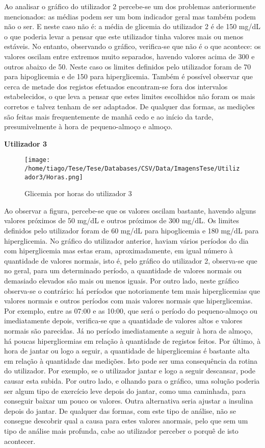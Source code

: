Ao analisar o gráfico do utilizador 2 percebe-se um dos problemas anteriormente mencionados: as médias podem ser um bom indicador geral mas também podem não o ser. E neste caso não é: a média de glicemia do utilizador 2 é de 150 mg/dL o que poderia levar a pensar que este utilizador tinha valores mais ou menos estáveis. No entanto, observando o gráfico, verifica-se que não é o que acontece: os valores oscilam entre extremos muito separados, havendo valores acima de 300 e outros abaixo de 50. Neste caso os limites definidos pelo utilizador foram de 70 para hipoglicemia e de 150 para hiperglicemia. Também é possível observar que cerca de metade dos registos efetuados encontram-se fora dos intervalos estabelecidos, o que leva a pensar que estes limites escolhidos não foram os mais corretos e talvez tenham de ser adaptados. De qualquer das formas, as medições são feitas mais frequentemente de manhã cedo e ao início da tarde, presumivelmente à hora de pequeno-almoço e almoço. 


\textbf{Utilizador 3}

\begin{figure}[H]
\centering
\texttt{[image: /home/tiago/Tese/Tese/Databases/CSV/Data/ImagensTese/Utilizador3/Horas.png]}
\caption{Glicemia por horas do utilizador 3}
\end{figure}

Ao observar a figura, percebe-se que os valores oscilam bastante, havendo alguns valores próximos de 50 mg/dL e outros próximos de 300 mg/dL. Os limites definidos pelo utilizador foram de 60 mg/dL para hipoglicemia e 180 mg/dL para hiperglicemia. No gráfico do utilizador anterior, haviam vários períodos do dia com hiperglicemia mas estas eram, aproximadamente, em igual número à quantidade de valores normais, isto é, pelo gráfico do utilizador 2, observa-se que no geral, para um determinado período, a quantidade de valores normais ou demasiado elevados são mais ou menos iguais. Por outro lado, neste gráfico observa-se o contrário: há períodos que notoriamente tem mais hiperglicemias que valores normais e outros períodos com mais valores normais que hiperglicemias. 
Por exemplo, entre as 07:00 e as 10:00, que será o período do pequeno-almoço ou imediatamente depois, verifica-se que a quantidade de valores altos e valores normais são parecidas. Já no período imediatamente a seguir à hora de almoço, há poucas hiperglicemias em relação à quantidade de registos feitos. Por último, à hora de jantar ou logo a seguir, a quantidade de hiperglicemias é bastante alta em relação à quantidade das medições. Isto pode ser uma consequência da rotina do utilizador. Por exemplo, se o utilizador jantar e logo a seguir descansar, pode causar esta subida. Por outro lado, e olhando para o gráfico, uma solução poderia ser algum tipo de exercício leve depois do jantar, como uma caminhada, para conseguir baixar um pouco os valores. Outra alternativa seria ajustar a insulina depois do jantar. 
De qualquer das formas, com este tipo de análise, não se consegue descobrir qual a causa para estes valores anormais, pelo que sem um tipo de análise mais profunda, cabe ao utilizador perceber o porquê de isto acontecer.



